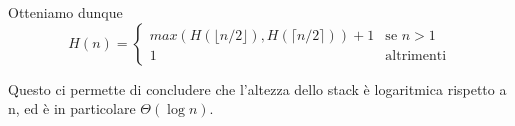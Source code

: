 \noindent Otteniamo dunque 
\begin{equation*}
    H(n) = \begin{cases}
        max(H(\lfloor n/2 \rfloor), H(\lceil n/2 \rceil)) + 1 & \text{se $n > 1$}\\
        1 & \text{altrimenti}
    \end{cases}
\end{equation*}

Questo ci permette di concludere che l'altezza dello stack è logaritmica rispetto a n, 
ed è in particolare $\Theta(\log n)$.
\clearpage
